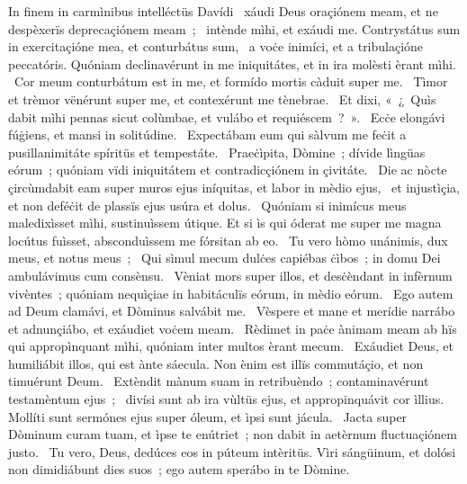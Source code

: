 { In finem in carmìnibus intelléctüs Davídi}
{%
~xáudi Deus oraçiónem meam, et ne despèxerïs deprecaçiónem meam~; 
~intènde mìhi, et exáudi me. Contrystátus sum in exercitaçióne mea, et conturbátus sum, 
~a voċe inimíci, et a tribulaçióne peccatóris. Quóniam declinavérunt in me iniquitátes, et in ira molèsti èrant mìhi. 
~Cor meum conturbátum est in me, et formído mortis càduit super me. 
~Tìmor et trèmor vënérunt super me, et contexérunt me tènebrae. 
~Et dixi, «~¿~Quìs dabit mìhi pennas sicut colùmbae, et vulábo et requiéscem~?~». 
~Ecċe elongávi fúġiens, et mansi in solitúdine. 
~Expectábam eum qui sàlvum me feċit a pusillanimitáte spíritüs et tempestáte. 
~Praeċìpita, Dòmine~; dívide lìngüas eórum~; quóniam vïdi iniquitátem et contradicçiónem in çivitáte. 
~Die ac nòcte çircùmdabit eam super muros ejus iníquitas, et labor in mèdio ejus, 
~et injustìçia, et non deféċit de plassïs ejus usúra et dolus. 
~Quóniam si inimícus meus maledixìsset mìhi, sustinuìssem útique. Et si ìs qui óderat me super me magna locútus fuìsset, absconduìssem me fórsitan ab eo. 
~Tu vero hòmo unánimis, dux meus, et notus meus~; 
~Qui sìmul mecum dulċes capiébas ċìbos~; in domu Dei ambulávimus cum consènsu. 
~Vèniat mors super illos, et desċèndant in infèrnum vivèntes~; quóniam nequìçiae in habitáculïs eórum, in mèdio eórum. 
~Ego autem ad Deum clamávi, et Dòminus salvábit me. 
~Vèspere et mane et merídie narrábo et adnunçiábo, et exáudiet voċem meam. 
~Rèdimet in paċe ànimam meam ab hïs qui appropìnquant mìhi, quóniam inter multos èrant mecum. 
~Exáudiet Deus, et humiliábit illos, qui est ànte sáecula. Non ènim est illïs commutáçio, et non timuérunt Deum. 
~Extèndit mànum suam in retribuèndo~; contaminavérunt testamèntum ejus~; 
~divísi sunt ab ira vùltüs ejus, et appropinquávit cor ìllius. Mollíti sunt sermónes ejus super óleum, et ìpsi sunt jácula. 
~Jacta super Dòminum curam tuam, et ìpse te enútriet~; non dabit in aetèrnum fluctuaçiónem justo. 
~Tu vero, Deus, dedúces eos in púteum intèritüs. Vìri sángüinum, et dolósi non dimidiábunt dies suos~; ego autem sperábo in te Dòmine. 
}
